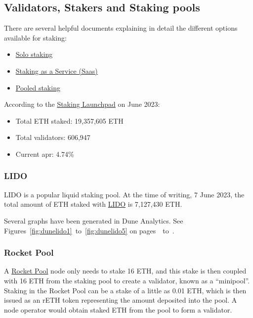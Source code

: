 \documentclass[UTF8]{article}
\begin{document}
\subsection{Validators, Stakers and Staking pools}
\label{sec:stakers}
There are several helpful documents explaining in detail the different options available for staking:
\begin{itemize}
\item \href{https://ethereum.org/en/staking/solo/}{Solo staking}
\item \href{https://ethereum.org/en/staking/saas/}{Staking as a Service (Saas)}
\item \href{https://ethereum.org/en/staking/pools/}{Pooled staking}
\end{itemize}

According to the \href{https://launchpad.ethereum.org/en/}{Staking Launchpad} on June 2023:
\begin{itemize}
\item Total ETH staked: 19,357,605 ETH
\item Total validators: 606,947
\item Current \gls{apr}: 4.74\%
\end{itemize}

\subsubsection*{LIDO}
LIDO is a popular liquid staking pool. 
At the time of writing, 7 June 2023, the total amount of ETH staked with \href{https://lido.fi/ethereum}{LIDO}  is 7,127,430 ETH. 

Several graphs have been generated in Dune Analytics. See Figures~\ref{fig:dunelido1}~to~\ref{fig:dunelido5} on pages~\pageref{fig:dunelido1}~to~\pageref{fig:dunelido5}.


\subsubsection*{Rocket Pool}
A \href{https://rocketpool.net/}{Rocket Pool} node only needs to stake 16 ETH, and this stake is then coupled with 16 ETH from the staking pool to create a validator, known as a ``minipool''.  Staking in the Rocket Pool can be a stake of a little as 0.01 ETH, which is then issued as an rETH token representing the amount deposited into the pool. A node operator would obtain staked ETH from the pool to form a validator.
\end{document}
